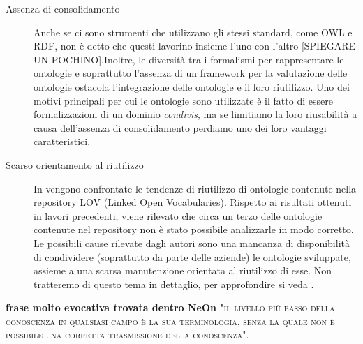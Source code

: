 \begin{description}
	\item[Assenza di consolidamento] \bvv Anche se ci sono strumenti che utilizzano gli stessi standard, come OWL e RDF, non è detto che questi lavorino insieme l'uno con l'altro \cite{hitzler2021review} [SPIEGARE UN POCHINO].\evv Inoltre, le diversità tra i formalismi per rappresentare le ontologie e soprattutto l'assenza di un framework per la valutazione delle ontologie ostacola l'integrazione delle ontologie e il loro riutilizzo. Uno dei motivi principali per cui le ontologie sono utilizzate è il fatto di essere formalizzazioni di un dominio \textit{condivis}, ma se limitiamo la loro riusabilità a causa dell'assenza di consolidamento perdiamo uno dei loro vantaggi caratteristici.
	
	\item[Scarso orientamento al riutilizzo] In \cite{whyareontologiesnotreused} vengono confrontate le tendenze di riutilizzo di ontologie contenute nella repository LOV (Linked Open Vocabularies). Rispetto ai risultati ottenuti in lavori precedenti, viene rilevato che circa un terzo delle ontologie contenute nel repository non è stato possibile analizzarle in modo corretto. Le possibili cause rilevate dagli autori sono una mancanza di disponibilità di condividere (soprattutto da parte delle aziende) le ontologie sviluppate, assieme a una scarsa manutenzione orientata al riutilizzo di esse. Non tratteremo di questo tema in dettaglio, per approfondire si veda \cite{ontology2014summit, feasibilityStudy}.
	
\end{description}


\textbf{frase molto evocativa trovata dentro NeOn \cite{NeOn}} \textsc{"il livello più basso della conoscenza in qualsiasi campo è la sua terminologia, senza la quale non è possibile una corretta trasmissione della conoscenza"}.


